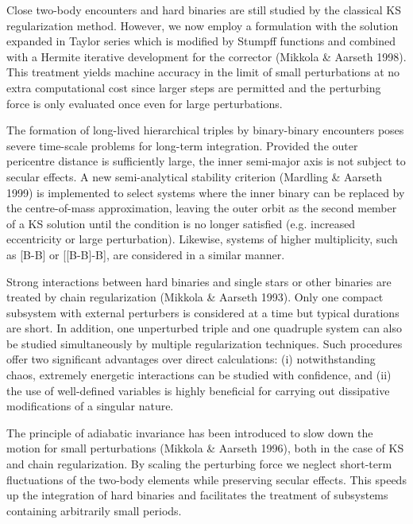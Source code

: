 \documentclass[12pt]{article}
\begin{document}
{\color{blue}
\medskip
Close two-body encounters and hard binaries are still studied by the
classical KS regularization method. However, we now employ a formulation
with the solution expanded in Taylor series which is modified by Stumpff
functions and combined with a Hermite iterative development for the
corrector (Mikkola \& Aarseth 1998).
This treatment yields machine accuracy in the limit of small
perturbations at no extra computational cost since larger steps are
permitted and the perturbing force is only evaluated once even for large
perturbations.

\color{green}
\medskip
The formation of long-lived hierarchical triples by binary-binary encounters
poses severe time-scale problems for long-term integration.
Provided the outer pericentre distance is sufficiently large, the inner
semi-major axis is not subject to secular effects.
A new semi-analytical stability criterion (Mardling \& Aarseth 1999) is
implemented to select systems where the inner binary can be replaced
by the centre-of-mass approximation, leaving the outer orbit as the
second member of a KS solution until the condition is no longer satisfied
(e.g. increased eccentricity or large perturbation).
Likewise, systems of higher multiplicity, such as [B-B] or [[B-B]-B], are
considered in a similar manner.

\color{cyan}
\medskip
Strong interactions between hard binaries and single stars or other
binaries are treated by chain regularization (Mikkola \& Aarseth 1993).
Only one compact subsystem with external perturbers is considered  at
a time but typical durations are short.
In addition, one unperturbed triple and one quadruple system can also be
studied simultaneously by multiple regularization techniques.
Such procedures offer two significant advantages over direct calculations:
(i) notwithstanding chaos, extremely energetic interactions can be studied
with confidence, and (ii) the use of well-defined variables is highly
beneficial for carrying out dissipative modifications of a singular nature.

\color{magenta}
\medskip
The principle of adiabatic invariance has been introduced to slow down the
motion for small perturbations (Mikkola \& Aarseth 1996), both in the case
of KS and chain regularization.
By scaling the perturbing force we neglect short-term
fluctuations of the two-body elements while preserving secular effects.
This speeds up the integration of hard binaries and facilitates the
treatment of subsystems containing arbitrarily small periods.

}
\end{document}
